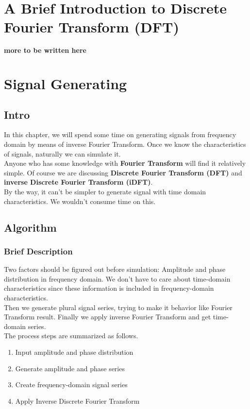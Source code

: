 \documentclass[
12pt, %
a4paper %
]{extreport}
\theoremstyle{plain}
\begin{document}
 
\chapter{A Brief Introduction to Discrete Fourier Transform (DFT)}
\textbf{\Large more to be written here}

\chapter{Signal Generating}
\section{Intro}
In this chapter, we will spend some time on generating signals from frequency domain by means of inverse Fourier Transform. Once we know the characteristics of signals, naturally we can simulate it. \\
Anyone who has some knowledge with \textbf{Fourier Transform} will find it relatively simple. Of course we are discussing \textbf{Discrete Fourier Transform (DFT)} and \textbf{inverse Discrete Fourier Transform (iDFT)}. \\
By the way, it can’t be simpler to generate signal with time domain characteristics. We wouldn't consume time on this.
\section{Algorithm}
\subsection{Brief Description}
Two factors should be figured out before simulation: Amplitude and phase distribution in frequency domain. We don't have to care about time-domain characteristics since these information is included in frequency-domain characteristics. \\
Then we generate plural signal series, trying to make it behavior like Fourier Transform result. Finally we apply inverse Fourier Transform and get time-domain series. \\
The process steps are summarized as follows. 
\begin{enumerate}
\item Input amplitude and phase distribution
\item Generate amplitude and phase series
\item Create frequency-domain signal series
\item Apply Inverse Discrete Fourier Transform
\end{enumerate}
\end{document}

